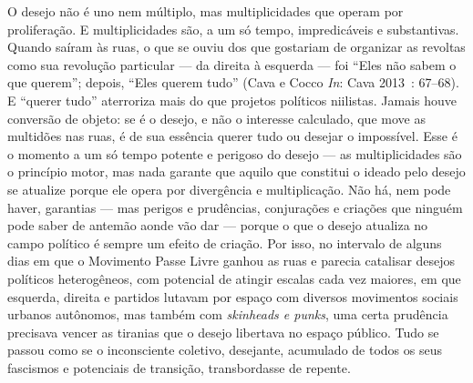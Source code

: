 O desejo não é uno nem múltiplo, mas
multiplicidades que operam por proliferação. E multiplicidades são, a um
só tempo, impredicáveis e substantivas. Quando saíram às ruas, o que se
ouviu dos que gostariam de organizar as revoltas como sua revolução
particular --- da direita à esquerda --- foi ``Eles não sabem o que
querem''; depois, ``Eles querem tudo'' (Cava e Cocco \emph{In}: Cava
2013~: 67--68). E ``querer tudo'' aterroriza mais do que projetos
políticos niilistas. Jamais houve conversão de objeto: se é o desejo, e
não o interesse calculado, que move as multidões nas ruas, é de sua
essência querer tudo ou desejar o impossível. Esse é o momento a um só
tempo potente e perigoso do desejo --- as multiplicidades são o princípio
motor, mas nada garante que aquilo que constitui o ideado pelo desejo se
atualize porque ele opera por divergência e multiplicação. Não há, nem
pode haver, garantias --- mas perigos e prudências, conjurações e
criações que ninguém pode saber de antemão aonde vão dar --- porque o que
o desejo atualiza no campo político é sempre um efeito de criação. Por
isso, no intervalo de alguns dias em que o Movimento Passe Livre ganhou
as ruas e parecia catalisar desejos políticos heterogêneos, com
potencial de atingir escalas cada vez maiores, em que esquerda, direita
e partidos lutavam por espaço com diversos movimentos sociais urbanos
autônomos, mas também com \emph{skinheads e punks}, uma certa prudência
precisava vencer as tiranias que o desejo libertava no espaço público.
Tudo se passou como se o inconsciente coletivo, desejante, acumulado de
todos os seus fascismos e potenciais de transição, transbordasse de
repente.

